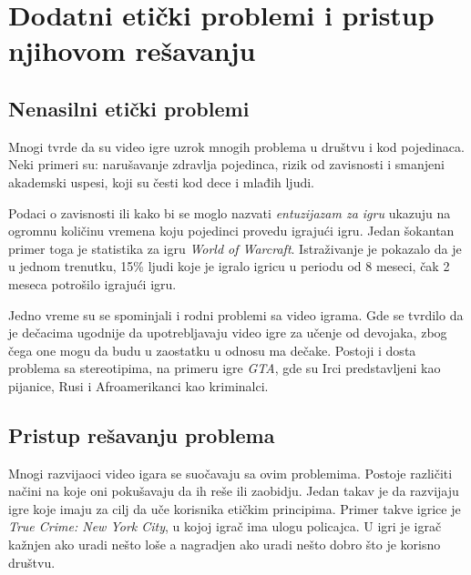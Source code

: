 \documentclass[a4paper]{article}
\begin{document}
\newpage
\section{Dodatni etički problemi i pristup njihovom rešavanju}
\label{sec:etika}
\subsection{Nenasilni etički problemi}
Mnogi tvrde da su video igre uzrok mnogih problema u društvu i kod pojedinaca. Neki primeri su: narušavanje zdravlja pojedinca,
rizik od zavisnosti i smanjeni akademski uspesi, koji su česti kod dece i mlađih ljudi.

Podaci o zavisnosti ili kako bi se moglo nazvati {\em entuzijazam za igru} ukazuju na ogromnu količinu vremena koju pojedinci
provedu igrajući igru. Jedan šokantan primer toga je statistika za igru {\em World of Warcraft}. Istraživanje je
pokazalo da je u jednom trenutku, 15\% ljudi koje je igralo igricu u periodu od 8 meseci, čak 2 meseca 
potrošilo igrajući igru.

Jedno vreme su se spominjali i rodni problemi sa video igrama. Gde se tvrdilo da je dečacima
ugodnije da upotrebljavaju video igre za učenje od devojaka, zbog čega one mogu da budu u zaostatku u odnosu ma dečake. 
Postoji i dosta problema sa stereotipima, na primeru igre {\em GTA}, gde su Irci predstavljeni kao pijanice, 
Rusi i Afroamerikanci kao kriminalci.

\subsection{Pristup rešavanju problema}
Mnogi razvijaoci video igara se suočavaju sa ovim problemima. Postoje različiti načini na koje oni pokušavaju da
ih reše ili zaobidju. Jedan takav je da razvijaju igre koje imaju za cilj da uče korisnika etičkim principima.
Primer takve igrice je {\em True Crime: New York City}, u kojoj igrač ima ulogu policajca. U igri je igrač kažnjen
ako uradi nešto loše a nagradjen ako uradi nešto dobro što je korisno društvu.
\end{document}
